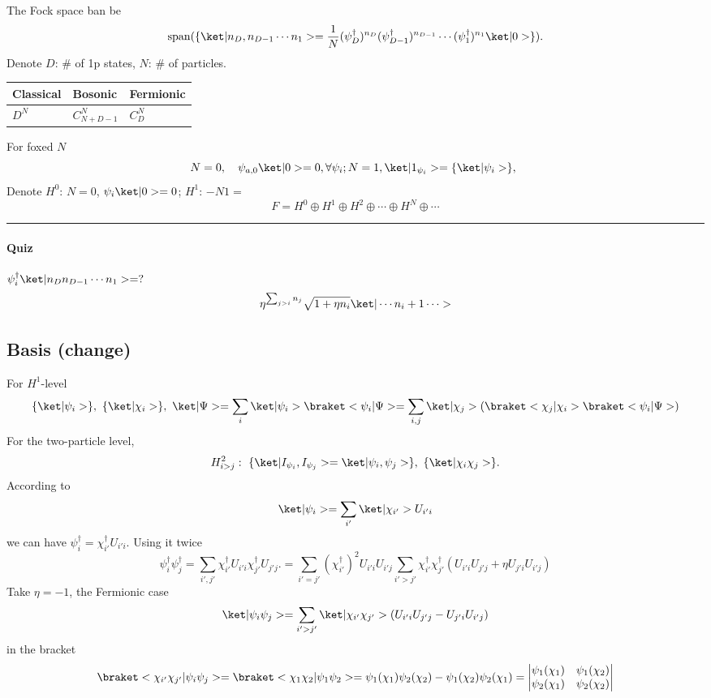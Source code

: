 The Fock space ban be
\[
  \operatorname{span} (\{\ket|n_D,n_{D-1} \cdots n_1> = 
  \frac1N
  (\psi_D^\dagger)^{n_D} (\psi_{D-1}^\dagger)^{n_{D-1}} \cdots
  (\psi_1^\dagger)^{n_1} \ket|0>\}).
\]
Denote $D$: \# of 1p states,
$N$: \# of particles.
\begin{center}
  \begin{tabular}{lll}
    \toprule
    Classical & Bosonic & Fermionic\\
    \midrule
    $D^N$ & $C_{N+D-1}^N$ & $C_D^N$\\
    \bottomrule
  \end{tabular}
\end{center}
For foxed $N$
\[
  N = 0,\quad \psi_{a,0}\ket|0> = 0, \forall\psi_i;
  N = 1, \ket|1_{\psi_i}> = \{\ket|\psi_i>\},\
\]
Denote $H^0$: $N = 0$, $\psi_i \ket|0> = 0$;
$H^1$: $-N1=$
\[
  F = H^0 \oplus H^1 \oplus H^2 \oplus \cdots \oplus H^N \oplus \cdots
\]
\rule\linewidth{1pt}
\[
  [\psi_i^\dagger, \psi_j^\dagger]_\eta = 0 = [\psi_i, \psi_j]_\eta, \quad
  [\psi_i, \psi_j^\dagger]_\eta = \delta_{ij}.
\]
\paragraph{Quiz}
$\psi_i^\dagger\ket|n_Dn_{D-1}\cdots n_1> = ?$
\[
  \eta^{\sum_{j>i} n_j} \sqrt{1 + \eta n_i}\ket|\cdots n_i + 1 \cdots>
\]
\subsection{Basis (change)}

For $H^1$-level
\[
  \{\ket|\psi_i>\},\ \{\ket|\chi_i>\},\
  \ket|\Psi> = \sum_i \ket|\psi_i>\braket<\psi_i|\Psi>
= \sum_{i,j} \ket|\chi_j>(\braket<\chi_j|\chi_i>\braket<\psi_i|\Psi>)
\]
For the two-particle level,
\[
  H_{i>j}^2:\ \{\ket|I_{\psi_i},I_{\psi_j}> = \ket|\psi_i,\psi_j>\},\
  \{\ket|\chi_i \chi_j>\}.
\]
According to
\[
  \ket|\psi_i> = \sum_{i'} \ket|\chi_{i'}> U_{i'i}
\]
we can have $\psi_i^\dagger = \chi_{i'}^\dagger U_{i'i}$. Using it twice
\[
  \psi_i^\dagger\psi_j^\dagger
= \sum_{i',j'} \chi_{i'}^\dagger U_{i'i} \chi_{j'}^\dagger U_{j'j}.
= \sum_{i'=j'} (\chi_{i'}^\dagger)^2 U_{i'i} U_{i'j}
  \sum_{i'>j'} \chi_{i'}^\dagger \chi_{j'}^\dagger
    (U_{i'i} U_{j'j} + \eta U_{j'i} U_{i'j})
\]
Take $\eta = -1$, the Fermionic case
\[
  \ket|\psi_i\psi_j> = \sum_{i'>j'} \ket|\chi_{i'}\chi_{j'}>
  (U_{i'i}U_{j'j} - U_{j'i} U_{i'j})
\]
in the bracket
\[
  \braket<\chi_{i'}\chi_{j'}|\psi_i\psi_j>
= \braket<\chi_1\chi_2|\psi_1\psi_2>
= \psi_1(\chi_1) \psi_2(\chi_2) - \psi_1(\chi_2) \psi_2(\chi_1)
= \begin{vmatrix}
    \psi_1(\chi_1) & \psi_1(\chi_2)\\
    \psi_2(\chi_1) & \psi_2(\chi_2)
  \end{vmatrix}
\]
